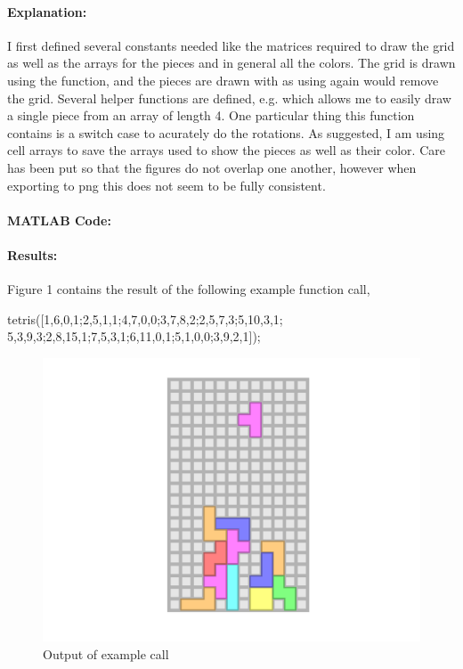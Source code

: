 
\paragraph{Explanation:}
I first defined several constants needed like the matrices required to draw the grid as well as the arrays for the pieces and in general all the colors.
The grid is drawn using the  function, and the pieces are drawn with  as using  again would remove the grid.
Several helper functions are defined, e.g.  which allows me to easily draw a single piece from an array of length 4.
One particular thing this function contains is a switch case to acurately do the rotations.
As suggested, I am using cell arrays to save the arrays used to show the pieces as well as their color.
Care has been put so that the figures do not overlap one another, however when exporting to png this does not seem to be fully consistent.

\paragraph{MATLAB Code:}

\begin{tiny}
    
\end{tiny}

\paragraph{Results:}

Figure 1 contains the result of the following example function call,
\begin{matlabcode}
    tetris([1,6,0,1;2,5,1,1;4,7,0,0;3,7,8,2;2,5,7,3;5,10,3,1;
            5,3,9,3;2,8,15,1;7,5,3,1;6,11,0,1;5,1,0,0;3,9,2,1]);
\end{matlabcode}

\begin{figure}[H]
    \centering
    \includegraphics[width=12cm]{figures/ex1}
    \caption{Output of example call}
\end{figure}

